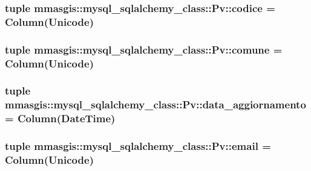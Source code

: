 \label{classmmasgis_1_1mysql__sqlalchemy__class_1_1Pv_a5dad0fb51aea5c29768eefd7e260f602}
\hypertarget{classmmasgis_1_1mysql__sqlalchemy__class_1_1Pv_a2f3c5ac2b2e12d4da0cfec51ede5a61b}{
\subsubsection[{codice}]{\setlength{\rightskip}{0pt plus 5cm}tuple {\bf mmasgis::mysql\_\-sqlalchemy\_\-class::Pv::codice} = Column(Unicode)}}
\label{classmmasgis_1_1mysql__sqlalchemy__class_1_1Pv_a2f3c5ac2b2e12d4da0cfec51ede5a61b}
\hypertarget{classmmasgis_1_1mysql__sqlalchemy__class_1_1Pv_a764c5f445960b6701e1229398fb381d3}{
\subsubsection[{comune}]{\setlength{\rightskip}{0pt plus 5cm}tuple {\bf mmasgis::mysql\_\-sqlalchemy\_\-class::Pv::comune} = Column(Unicode)}}
\label{classmmasgis_1_1mysql__sqlalchemy__class_1_1Pv_a764c5f445960b6701e1229398fb381d3}
\hypertarget{classmmasgis_1_1mysql__sqlalchemy__class_1_1Pv_a525b48c4651a92b0a114689b7d9744bc}{
\subsubsection[{data\_\-aggiornamento}]{\setlength{\rightskip}{0pt plus 5cm}tuple {\bf mmasgis::mysql\_\-sqlalchemy\_\-class::Pv::data\_\-aggiornamento} = Column(DateTime)}}
\label{classmmasgis_1_1mysql__sqlalchemy__class_1_1Pv_a525b48c4651a92b0a114689b7d9744bc}
\hypertarget{classmmasgis_1_1mysql__sqlalchemy__class_1_1Pv_ab639489c7a3c20b8c912aa596cf57feb}{
\subsubsection[{email}]{\setlength{\rightskip}{0pt plus 5cm}tuple {\bf mmasgis::mysql\_\-sqlalchemy\_\-class::Pv::email} = Column(Unicode)}}
